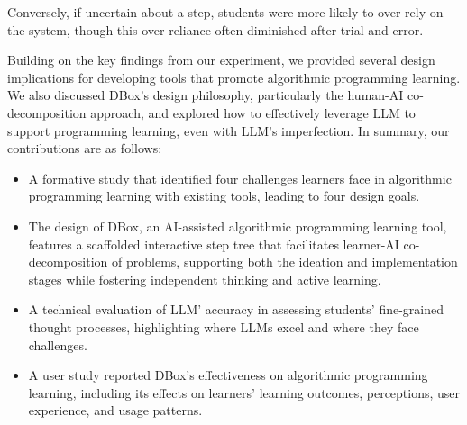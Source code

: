 Conversely, if uncertain about a step, students were more likely to over-rely on the system, though this over-reliance often diminished after trial and error.


Building on the key findings from our experiment, we provided several design implications for developing tools that promote algorithmic programming learning. We also discussed DBox's design philosophy, particularly the human-AI co-decomposition approach, and explored how to effectively leverage LLM to support programming learning, even with LLM's imperfection. In summary, our contributions are as follows:



\begin{itemize}
    \item A formative study that identified four challenges learners face in algorithmic programming learning with existing tools, leading to four design goals.
    \item The design of DBox, an AI-assisted algorithmic programming learning tool, features a scaffolded interactive step tree that facilitates learner-AI co-decomposition of problems, supporting both the ideation and implementation stages while fostering independent thinking and active learning.
    \item A technical evaluation of LLM' accuracy in assessing students' fine-grained thought processes, highlighting where LLMs excel and where they face challenges.
    \item A user study reported DBox's effectiveness on algorithmic programming learning, including its effects on learners' learning outcomes, perceptions, user experience, and usage patterns.
\end{itemize}






